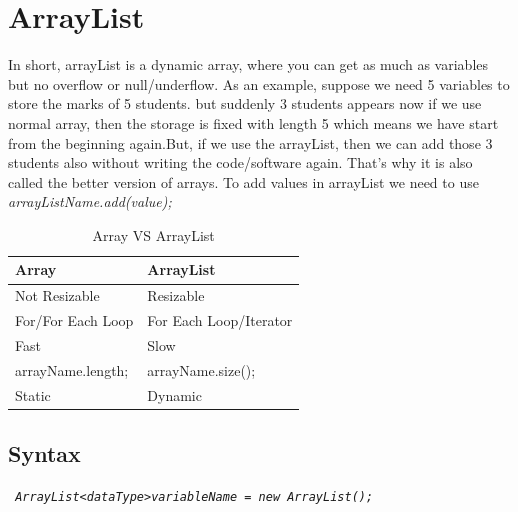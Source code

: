 \documentclass[openany]{book}  %
\begin{document}
\section{ArrayList}
In short, arrayList is a dynamic array, where you can get as 
much as variables but no overflow or null/underflow. As an example, suppose we need 5
variables to store the marks of 5 students. but suddenly 3 students appears
now if we use normal array, then the storage is fixed with length 5 which
means we have start from the beginning again.But, if we use the 
arrayList, then we can add those 3 students also without writing the 
code/software again. That's why it is also called the better version of arrays.\linebreak
To add values in arrayList we need to use \textit{arrayListName.add(value);}
% 
% 
\begin{table}[htbp]
    \begin{tabular}{|l|l|}
    \hline
    Array             & ArrayList              \\ \hline
    Not Resizable     & Resizable              \\ \hline
    For/For Each Loop & For Each Loop/Iterator \\ \hline
    Fast              & Slow                   \\ \hline
    arrayName.length; & arrayName.size();      \\ \hline
    Static            & Dynamic                \\ \hline
    \end{tabular}
    \centering
    \caption{Array VS ArrayList}
\end{table}
% 
% 
\subsection{Syntax}
\begin{center}
    \tt{
        \textit{ArrayList<dataType>variableName = new ArrayList();}
    }
\end{center}
% 
%
\end{document}
